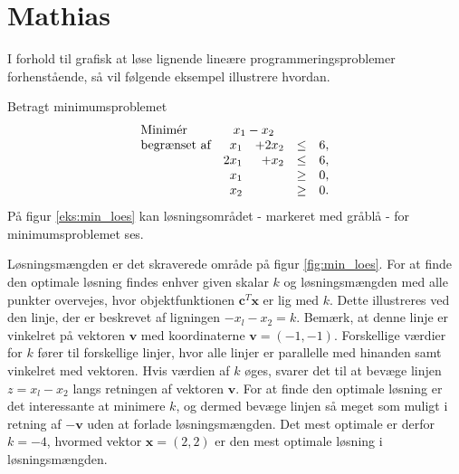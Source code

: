 \section{Mathias}

I forhold til grafisk at løse lignende lineære programmeringsproblemer forhenstående, så vil følgende eksempel illustrere hvordan. 

\begin{eks}
\label{eks:min_loes}
Betragt minimumsproblemet
%
\begin{align*}
\begin{array}{lrrlr}
\text{Minimér}		&	\multicolumn{2}{c}{x_1-x_2}  &\\
\text{begrænset af}	&x_1& + 2x_2			&\leq 	& 6,\\
					&2x_1& + x_2			&\leq	& 6,\\
					&x_1&    				&\geq	& 0,\\
					&x_2&    				&\geq	& 0.\\
\end{array}
\end{align*}
%
På figur \ref{eks:min_loes} kan løsningsområdet - markeret med gråblå - for minimumsproblemet ses.
%

\end{eks}
\noindent
Løsningsmængden er det skraverede område på figur \ref{fig:min_loes}. For at finde den optimale løsning findes enhver given skalar $k$ og løsningsmængden med alle punkter overvejes, hvor objektfunktionen $\textbf{c}^T\textbf{x}$ er lig med $k$. Dette illustreres ved den linje, der er beskrevet af ligningen $-x_l-x_2=k$. Bemærk, at denne linje er vinkelret på vektoren $\textbf{v}$ med koordinaterne $\textbf{v}=(-1,-1)$.
Forskellige værdier for $k$ fører til forskellige linjer, hvor  alle linjer er parallelle med hinanden samt vinkelret med vektoren. Hvis værdien af $k$ øges, svarer det til at bevæge linjen $z=x_l-x_2$ langs retningen af vektoren $\textbf{v}$. For at finde den optimale løsning er det interessante at minimere $k$, og dermed bevæge linjen så meget som muligt i retning af $-\textbf{v}$ uden at forlade løsningsmængden. Det mest optimale er derfor $k = -4$, hvormed vektor $\textbf{x}=(2,2)$ er den mest optimale løsning i løsningsmængden. 